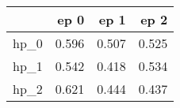 \begin{tabular}{lrrr}
\toprule
{} &   ep 0 &   ep 1 &   ep 2 \\
\midrule
hp\_0 &  0.596 &  0.507 &  0.525 \\
hp\_1 &  0.542 &  0.418 &  0.534 \\
hp\_2 &  0.621 &  0.444 &  0.437 \\
\bottomrule
\end{tabular}
